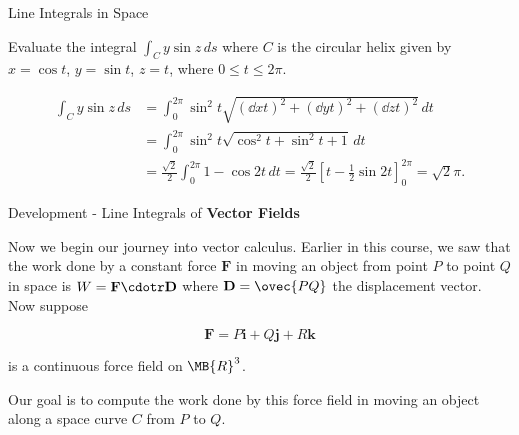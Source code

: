 \documentclass[11pt,english,
handout
]{beamer}
\begin{document}
\begin{frame}[t]{Line Integrals in Space}
\small
\begin{example}
Evaluate the integral $\displaystyle \int_Cy\sin z\,ds$ where $C$ is the circular helix given by $x=\cos t$, $y=\sin t$, $z=t$, where $0\leq t\leq 2\pi$.\pause

\lspace
\begin{align*}
\int_Cy\sin z\,ds&=\int_0^{2\pi}\sin^2t \sqrt{\left(\dd{x}{t}\right)^2+\left(\dd{y}{t}\right)^2+\left(\dd{z}{t}\right)^2}\,dt\\[2mm]
&=\int_0^{2\pi}\sin^2t \sqrt{\cos^2t+\sin^2t+1}\,dt\\[2mm]
&=\frac{\sqrt{2}}{2}\int_0^{2\pi}1-\cos2t\,dt=\frac{\sqrt{2}}{2}\left[t-\frac{1}{2}\sin2t\right]_0^{2\pi}=\sqrt{2}\pi.
\end{align*}
\end{example}
\end{frame}












\begin{frame}[t]{Development - Line Integrals of \textbf{Vector Fields}}

Now we begin our journey into vector calculus. \pause Earlier in this course, we saw that the work done by a constant force $\mathbf{F}$ in moving an object from point $P$ to point $Q$ in space is $W=\mathbf{F}\cdotr\mathbf{D}$ where $\mathbf{D}=\ovec{PQ}$ the displacement vector. \pause Now suppose 

\[
\mathbf{F}=P\mathbf{i}+Q\mathbf{j}+R\mathbf{k}
\] 

is a continuous force field on $\MB{R}^3$. \pause 

\lspace

Our goal is to compute the work done by this force field in moving an object along a space curve $C$ from $P$ to $Q$. 
\end{frame}
\end{document}
